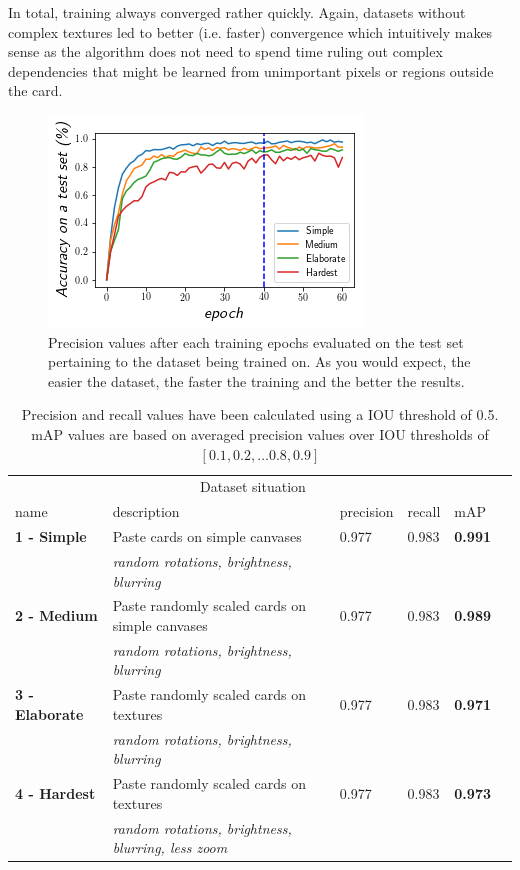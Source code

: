 \documentclass[a4paper]{article}
\begin{document}
In total, training always converged rather quickly. Again, datasets without complex textures led to better (i.e. faster) convergence which intuitively makes sense as the algorithm does not need to spend time ruling out complex dependencies that might be learned from unimportant pixels or regions outside the card.\\
\begin{figure}

\includegraphics[scale=1]{loss}

\caption{Precision values after each training epochs evaluated on the test set pertaining to the dataset being trained on. As you would expect, the easier the dataset, the faster the training and the better the results. }


\end{figure}
\begin{table}[h]


\begin{tabular}{lllllr}
\hline
\multicolumn{5}{c}{Dataset situation} \\
\cline{1-2}
name    & description  & precision & recall & mAP \\
\hline
\textbf{1 - Simple}      & Paste cards on simple canvases    &  0.977  & 0.983 & \textbf{0.991} \\
          & \textit{random rotations, brightness, blurring}     & & & \\
\textbf{2 - Medium}      & Paste randomly scaled cards on simple canvases & 0.977 & 0.983 & \textbf{0.989} \\
          & \textit{random rotations, brightness, blurring}     & & & \\
\textbf{3 - Elaborate}       & Paste randomly scaled cards on textures & 0.977 & 0.983 & \textbf{0.971} \\
          & \textit{random rotations, brightness, blurring}     & & & \\
\textbf{4 - Hardest} & Paste randomly scaled cards on textures & 0.977 & 0.983 & \textbf{0.973} \\
          & \textit{random rotations, brightness, blurring, less zoom}     & & & \\
\hline


\end{tabular}
\caption{Precision and recall values have been calculated using a IOU threshold of 0.5. mAP values are based on averaged precision values over IOU thresholds of $[0.1, 0.2, \dots 0.8, 0.9] $  }
\label{tab:res}
\end{table}
\end{document}
